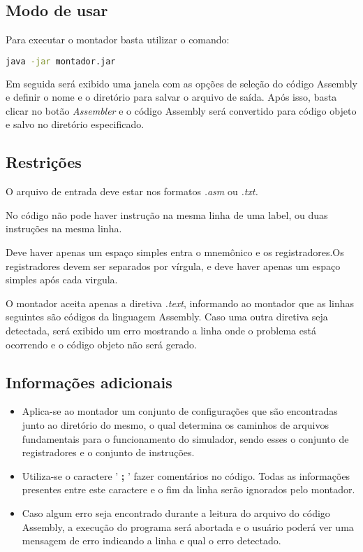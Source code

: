 \documentclass{report}
\begin{document}
    \subsection{Modo de usar}
    Para executar o montador basta utilizar o comando:\begin{lstlisting}[language=bash]
    java -jar montador.jar
	\end{lstlisting}
    Em seguida será exibido uma janela com as opções de seleção do código Assembly e definir o nome e o diretório para salvar o arquivo de saída. Após isso, basta clicar no botão \textit{Assembler} e o código Assembly será convertido para código objeto e salvo no diretório especificado. 
    
    \subsection{Restrições}
     
     \begin{itemize}
   \item {O arquivo de entrada deve estar nos formatos \textit{.asm} ou \textit{.txt.}}
   \item {No código não pode haver instrução na mesma linha de uma label, ou duas instruções na mesma linha. 
   \item Deve haver apenas um espaço simples entra o mnemônico e os registradores.Os registradores devem ser separados por vírgula, e deve haver apenas um espaço simples após cada virgula. }
   \item {O montador aceita apenas a diretiva \textit{.text}, informando ao montador que as linhas seguintes são códigos da linguagem Assembly. Caso uma outra diretiva seja detectada, será exibido um erro mostrando a linha onde o problema está ocorrendo e o código objeto não será gerado.}
  \end{itemize}
     
    \subsection{Informações adicionais} 
    \begin{itemize}
   \item {Aplica-se ao montador um conjunto de configurações que são encontradas junto ao diretório do mesmo, o qual determina os caminhos de arquivos fundamentais para o funcionamento do simulador, sendo esses o conjunto de registradores e o conjunto de instruções.}
   \item Utiliza-se o caractere ' \textbf{;} ' fazer comentários no código. Todas as informações presentes entre este caractere e o fim da linha serão ignorados pelo montador. 
   \item Caso algum erro seja encontrado durante a leitura do arquivo do código Assembly, a execução do programa será abortada e o usuário poderá ver uma mensagem de erro indicando a linha e qual o erro detectado.

  
  \end{itemize}
    
\end{document}
